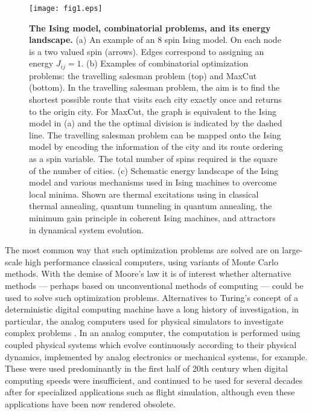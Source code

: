 \documentclass[fleqn,10pt]{wlscirep}
\begin{document}
%
\begin{figure}[t]
\begin{center}
\texttt{[image: fig1.eps]} 
\end{center}
\caption{{\bf The Ising model, combinatorial problems, and its energy landscape.}  (a) An example of an 8 spin Ising model.  On each node is a two valued spin (arrows). Edges correspond to assigning an energy $ J_{ij} = 1$. (b) Examples of combinatorial optimization problems:  the travelling salesman problem (top) and MaxCut (bottom).  In the travelling salesman problem, the aim is to find the shortest possible route that visits each city exactly once and returns to the origin city. For MaxCut, the graph is 
equivalent to the Ising model in (a) and the the optimal division is indicated by the dashed line.  The travelling salesman problem can be mapped onto the Ising model by encoding the information of the city and its route ordering as a spin variable.  The total number of spins required is the square of the number of cities.  (c) Schematic energy landscape of the Ising model and various mechanisms used in Ising machines to overcome local minima.  Shown are thermal 
excitations using in classical thermal annealing, quantum tunneling in quantum annealing, the minimum gain principle in coherent Ising machines, and attractors in dynamical system evolution.  
\label{fig1}} 
\end{figure}
%
The most common way that such optimization problems are solved are on large-scale high performance classical computers, using variants of Monte Carlo methods.  With the demise of Moore's law it is of interest whether alternative methods --- perhaps based on unconventional methods of computing --- could be used to solve such optimization problems.  Alternatives to Turing's concept of a deterministic digital computing machine \cite{turing1937computable} have a long history of investigation, in particular, the analog computers used for  physical simulators to investigate complex problems \cite{bournez2018handbook}. In an analog computer, the computation is performed using coupled physical systems which evolve continuously according to their physical dynamics, implemented by analog electronics or mechanical systems, for example.  These were used predominantly in the first half of 20th century when digital computing speeds were insufficient, and continued to be used for several decades after for specialized applications such as flight simulation, although even these applications have been now rendered obsolete. 
\end{document}
